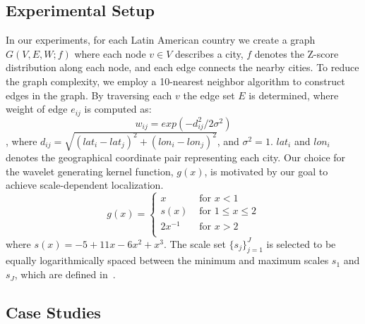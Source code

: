\subsection{Experimental Setup}
\label{sec:experimental_setup}
In our experiments, for each Latin American country we create a graph $G(V,E,W; f)$ where each node $v \in V$ describes a city, $f$ denotes the Z-score distribution along each node, and each edge connects the nearby cities. To reduce the graph complexity, we employ a 10-nearest neighbor algorithm to construct edges in the graph. By traversing each $v$ the edge set $E$ is determined, where weight of edge $e_{ij}$ is computed as:
\begin{equation}
w_{ij}=exp(-{d^2_{ij}}/{2\sigma^2})
\end{equation} , where $d_{ij}=\sqrt{(lat_i-lat_j)^2+(lon_i-lon_j)^2}$, and $\sigma^2=1$. $lat_i$ and $lon_i$ denotes the geographical coordinate pair representing each city.
Our choice for the wavelet generating kernel function, $g(x)$, is motivated by our goal to achieve scale-dependent localization.
\begin{equation}
g(x) = \left\{ \begin{array}{rl}
 x &\mbox{ for $x<1$} \\
s(x) &\mbox{ for $1\leq x \leq 2$} \\
 2x^{-1} &\mbox{ for $x>2$} \\
       \end{array} \right.
\end{equation}
where $s(x)=-5+11x-6x^2+x^3$.
The scale set $\{s_j\}_{j=1}^J$ is selected to be equally logarithmically spaced between the minimum and maximum scales $s_1$ and $s_J$, which are defined in~\cite{hammond2011wavelets}.

\subsection{Case Studies}
\label{sec:highlighted_results}

